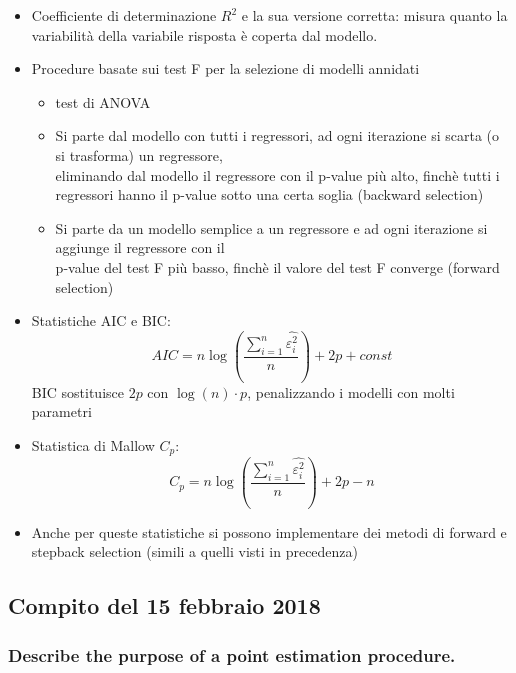 \documentclass[
]{article}
\begin{document}
\begin{itemize}
\item
  Coefficiente di determinazione \(R^2\) e la sua versione corretta:
  misura quanto la variabilità della variabile risposta è coperta dal
  modello.
\item
  Procedure basate sui test F per la selezione di modelli annidati

  \begin{itemize}
  \item
    test di ANOVA
  \item
    Si parte dal modello con tutti i regressori, ad ogni iterazione si
    scarta (o si trasforma) un regressore,\\
    eliminando dal modello il regressore con il p-value più alto, finchè
    tutti i regressori hanno il p-value sotto una certa soglia (backward
    selection)
  \item
    Si parte da un modello semplice a un regressore e ad ogni iterazione
    si aggiunge il regressore con il\\
    p-value del test F più basso, finchè il valore del test F converge
    (forward selection)
  \end{itemize}
\item
  Statistiche AIC e BIC:
  \[ AIC = n \log\left( \frac{\sum_{i=1}^n \hat{\varepsilon_i^2}}{n} \right) + 2p + const \]
  BIC sostituisce \(2p\) con \(\log(n)\cdot p\), penalizzando i modelli
  con molti parametri
\item
  Statistica di Mallow \(C_p\):
  \[ C_p = n \log\left( \frac{\sum_{i=1}^n \hat{\varepsilon_i^2}}{n} \right) + 2p - n \]
\item
  Anche per queste statistiche si possono implementare dei metodi di
  forward e stepback selection (simili a quelli visti in precedenza)
\end{itemize}

\hypertarget{compito-del-15-febbraio-2018}{%
\subsection{Compito del 15 febbraio
2018}\label{compito-del-15-febbraio-2018}}

\hypertarget{describe-the-purpose-of-a-point-estimation-procedure.}{%
\subsubsection{Describe the purpose of a point estimation
procedure.}\label{describe-the-purpose-of-a-point-estimation-procedure.}}
\end{document}
